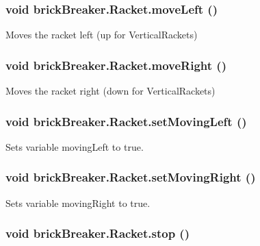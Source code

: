 \hypertarget{classbrick_breaker_1_1_racket_ab92ecb01070ce2fdefd99c3cc5212994}{
\subsubsection[{moveLeft}]{\setlength{\rightskip}{0pt plus 5cm}void brickBreaker.Racket.moveLeft ()}}
\label{classbrick_breaker_1_1_racket_ab92ecb01070ce2fdefd99c3cc5212994}
Moves the racket left (up for VerticalRackets) \hypertarget{classbrick_breaker_1_1_racket_a755ac54ffa2ff2013442cda726fcf268}{
\subsubsection[{moveRight}]{\setlength{\rightskip}{0pt plus 5cm}void brickBreaker.Racket.moveRight ()}}
\label{classbrick_breaker_1_1_racket_a755ac54ffa2ff2013442cda726fcf268}
Moves the racket right (down for VerticalRackets) \hypertarget{classbrick_breaker_1_1_racket_a350fa11540f07d2eed108a1aa75240e2}{
\subsubsection[{setMovingLeft}]{\setlength{\rightskip}{0pt plus 5cm}void brickBreaker.Racket.setMovingLeft ()}}
\label{classbrick_breaker_1_1_racket_a350fa11540f07d2eed108a1aa75240e2}
Sets variable movingLeft to true. \hypertarget{classbrick_breaker_1_1_racket_ac2bdea9a9f15d06648f2c2094ff123ba}{
\subsubsection[{setMovingRight}]{\setlength{\rightskip}{0pt plus 5cm}void brickBreaker.Racket.setMovingRight ()}}
\label{classbrick_breaker_1_1_racket_ac2bdea9a9f15d06648f2c2094ff123ba}
Sets variable movingRight to true. \hypertarget{classbrick_breaker_1_1_racket_a1d5ee505bd935fa6b8ea6001c15a57b9}{
\subsubsection[{stop}]{\setlength{\rightskip}{0pt plus 5cm}void brickBreaker.Racket.stop ()}}
